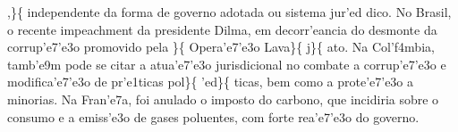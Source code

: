 ,\}\{\rtlch{}  \ltrch{} 
independente da forma de governo adotada ou sistema jur'ed dico. No
Brasil, o recente impeachment da presidente Dilma, em decorr'eancia do
desmonte da corrup'e7'e3o promovido pela \}\{\rtlch{} 
\ltrch{}  Opera'e7'e3o Lava\}\{\rtlch{} 
\ltrch{}  j\}\{\rtlch{}  \ltrch{}
 ato. Na Col'f4mbia, tamb'e9m pode se
citar a atua'e7'e3o jurisdicional no combate a corrup'e7'e3o e
modifica'e7'e3o de pr'e1ticas pol\}\{\rtlch{}  \ltrch{}
 'ed\}\{ \rtlch{}  \ltrch{}
 ticas, bem como a prote'e7'e3o a
minorias. Na Fran'e7a, foi anulado o imposto do carbono, que incidiria
sobre o consumo e a emiss'e3o de gases poluentes, com forte rea'e7'e3o
do governo.

\par 

